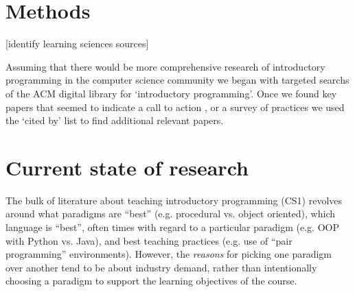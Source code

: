\documentclass[12pt]{article}
\let\textcite=\autocite
\begin{document}
\section{Methods}
[identify learning sciences sources]

Assuming that there would be more comprehensive research of
introductory programming in the computer science community we began
with targeted searchs of the ACM digital library for `introductory
programming'. Once we found key papers that seemed to indicate a call
to action
\autocite[e.g.][]{mccracken_multinational_2001,kolling_problem_1999},
or a survey of practices
\autocite[e.g.][]{pears_survey_2007-1,robins_learning_2003} we used
the `cited by' list to find additional relevant papers.




\section{Current state of research}
The bulk of literature about teaching introductory programming (CS1)
revolves around what paradigms are ``best'' (e.g. procedural vs. object
oriented), which language is ``best'', often times with regard to a
particular paradigm (e.g. OOP with Python vs. Java), and best teaching
practices (e.g. use of “pair programming” environments). However, the
\emph{reasons} for picking one paradigm over another tend to be about
industry demand, rather than intentionally choosing a paradigm to
support the learning objectives of the course.
\end{document}
